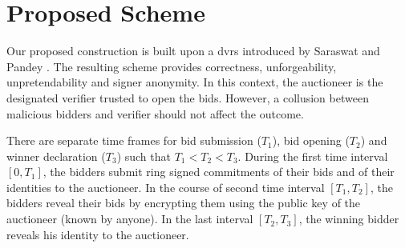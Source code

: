 \section{Proposed Scheme}
Our proposed construction is built upon a \gls{dvrs} introduced by Saraswat and Pandey \cite{saraswat2014leak}. The resulting scheme provides correctness, unforgeability, unpretendability and signer anonymity. In this context, the auctioneer is the designated verifier trusted to open the bids. However, a collusion between malicious bidders and verifier should not affect the outcome.

There are separate time frames for bid submission ($T_1$), bid opening ($T_2$) and winner declaration ($T_3$) such that $T_1 < T_2 < T_3$. During the first time interval $[0, T_1]$, the bidders submit ring signed commitments of their bids and of their identities to the auctioneer. In the course of second time interval $[T_1, T_2]$, the bidders reveal their bids by encrypting them using the public key of the auctioneer (known by anyone). In the last interval $[T_2, T_3]$, the winning bidder reveals his identity to the auctioneer.


